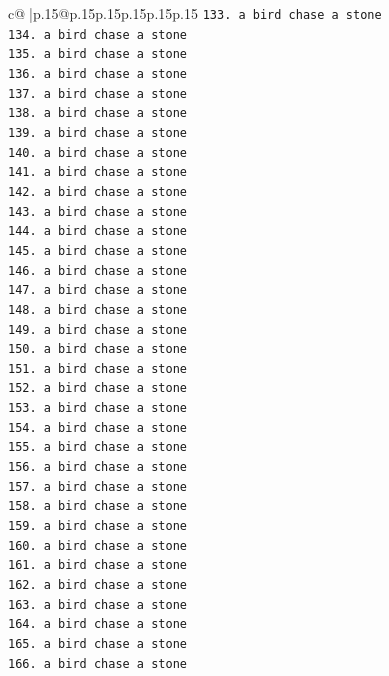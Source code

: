 \documentclass{article}
\begin{document}
{\begin{supertabular}{c@{$\;$}|p{.15\linewidth}@{}p{.15\linewidth}p{.15\linewidth}p{.15\linewidth}p{.15\linewidth}p{.15\linewidth}}
{{{\texttt{133. a bird chase a stone} \\
\texttt{134. a bird chase a stone} \\
\texttt{135. a bird chase a stone} \\
\texttt{136. a bird chase a stone} \\
\texttt{137. a bird chase a stone} \\
\texttt{138. a bird chase a stone} \\
\texttt{139. a bird chase a stone} \\
\texttt{140. a bird chase a stone} \\
\texttt{141. a bird chase a stone} \\
\texttt{142. a bird chase a stone} \\
\texttt{143. a bird chase a stone} \\
\texttt{144. a bird chase a stone} \\
\texttt{145. a bird chase a stone} \\
\texttt{146. a bird chase a stone} \\
\texttt{147. a bird chase a stone} \\
\texttt{148. a bird chase a stone} \\
\texttt{149. a bird chase a stone} \\
\texttt{150. a bird chase a stone} \\
\texttt{151. a bird chase a stone} \\
\texttt{152. a bird chase a stone} \\
\texttt{153. a bird chase a stone} \\
\texttt{154. a bird chase a stone} \\
\texttt{155. a bird chase a stone} \\
\texttt{156. a bird chase a stone} \\
\texttt{157. a bird chase a stone} \\
\texttt{158. a bird chase a stone} \\
\texttt{159. a bird chase a stone} \\
\texttt{160. a bird chase a stone} \\
\texttt{161. a bird chase a stone} \\
\texttt{162. a bird chase a stone} \\
\texttt{163. a bird chase a stone} \\
\texttt{164. a bird chase a stone} \\
\texttt{165. a bird chase a stone} \\
\texttt{166. a bird chase a stone} \\
}}}
\end{supertabular}}
\end{document}
